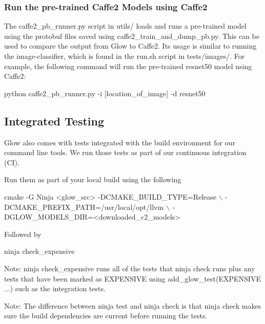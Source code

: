 \subsubsection*{Run the pre-\/trained Caffe2 Models using Caffe2}

The {\ttfamily caffe2\+\_\+pb\+\_\+runner.\+py} script in {\ttfamily utils/} loads and runs a pre-\/trained model using the protobuf files saved using {\ttfamily caffe2\+\_\+train\+\_\+and\+\_\+dump\+\_\+pb.\+py}. This can be used to compare the output from Glow to Caffe2. Its usage is similar to running the {\ttfamily image-\/classifier}, which is found in the {\ttfamily run.\+sh} script in {\ttfamily tests/images/}. For example, the following command will run the pre-\/trained resnet50 model using Caffe2\+:


\begin{DoxyCode}
python caffe2\_pb\_runner.py -i [location\_of\_image] -d resnet50
\end{DoxyCode}


\subsection*{Integrated Testing}

Glow also comes with tests integrated with the build environment for our command line tools. We run those tests as part of our continuous integration (CI).

Run them as part of your local build using the following 
\begin{DoxyCode}
cmake -G Ninja <glow\_src>  -DCMAKE\_BUILD\_TYPE=Release \(\backslash\)
      -DCMAKE\_PREFIX\_PATH=/usr/local/opt/llvm         \(\backslash\)
      -DGLOW\_MODELS\_DIR=<downloaded\_c2\_models>
\end{DoxyCode}
 Followed by 
\begin{DoxyCode}
ninja check\_expensive
\end{DoxyCode}


Note\+: {\ttfamily ninja check\+\_\+expensive} runs all of the tests that {\ttfamily ninja check} runs plus any tests that have been marked as E\+X\+P\+E\+N\+S\+I\+VE using add\+\_\+glow\+\_\+test(E\+X\+P\+E\+N\+S\+I\+VE ...) such as the integration tests.

Note\+: The difference between {\ttfamily ninja test} and {\ttfamily ninja check} is that {\ttfamily ninja check} makes sure the build dependencies are current before running the tests. 
